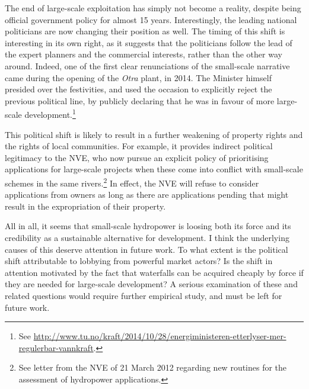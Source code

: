 The end of large-scale exploitation has simply not become a reality, despite being official government policy for almost 15 years. Interestingly, the leading national politicians are now changing their position as well. The timing of this shift is interesting in its own right, as it suggests that the politicians follow the lead of the expert planners and the commercial interests, rather than the other way around. Indeed, one of the first clear renunciations of the small-scale narrative came during the opening of the {\it Otra} plant, in 2014. The Minister himself presided over the festivities, and used the occasion to explicitly reject the previous political line, by publicly declaring that he was in favour of more large-scale development.\footnote{See \url{http://www.tu.no/kraft/2014/10/28/energiministeren-etterlyser-mer-regulerbar-vannkraft}.}

This political shift is likely to result in a further weakening of property rights and the rights of local communities. For example, it provides indirect political legitimacy to the NVE, who now pursue an explicit policy of prioritising applications for large-scale projects when these come into conflict with small-scale schemes in the same rivers.\footnote{See letter from the NVE of 21 March 2012 regarding new routines for the assessment of hydropower applications.} In effect, the NVE will refuse to consider applications from owners as long as there are applications pending that might result in the expropriation of their property.

All in all, it seems that small-scale hydropower is loosing both its force and its credibility as a sustainable alternative for development. I think the underlying causes of this deserve attention in future work. To what extent is the political shift attributable to lobbying from powerful market actors? Is the shift in attention motivated by the fact that waterfalls can be acquired cheaply by force if they are needed for large-scale development? A serious examination of these and related questions would require further empirical study, and must be left for future work.

